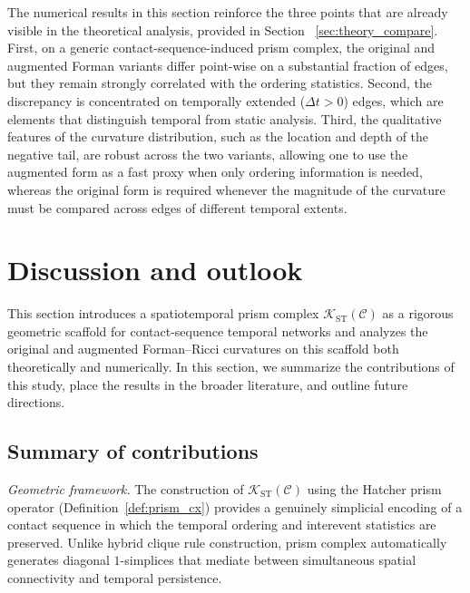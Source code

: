 \documentclass[
    pre,
    twocolumn,
    superscriptaddress,
    showpacs,
    nofootinbib,
    amsmath,
    amssymb,
    floatfix
]{revtex4-2}
\newcommand{\K}{\mathcal{K}}
\newcommand{\dt}{\Delta t}
\theoremstyle{plain} %
\theoremstyle{definition} %
\begin{document}
The numerical results in this section reinforce the three points that are already visible in the theoretical analysis, provided in Section ~\ref{sec:theory_compare}.
First, on a generic contact-sequence-induced prism complex, the original and augmented Forman variants differ point-wise on a substantial fraction of edges, but they remain strongly correlated with the ordering statistics.
Second, the discrepancy is concentrated on temporally extended ($\dt>0$) edges, which are elements that distinguish temporal from static analysis.
Third, the qualitative features of the curvature distribution, such as the location and depth of the negative tail, are robust across the two variants, allowing one to use the augmented form as a fast proxy when only ordering information is needed, whereas the original form is required whenever the magnitude of the curvature must be compared across edges of different temporal extents.

\section{Discussion and outlook}\label{sec:conclusion}

This section introduces a spatiotemporal prism complex
$\K_{\mathrm{ST}}(\mathcal{C})$ as a rigorous geometric scaffold for
contact-sequence temporal networks and analyzes the original
and augmented Forman--Ricci curvatures on this scaffold both theoretically and numerically.  In this section, we summarize the contributions of this study, place the results in the broader literature, and outline future directions.

\subsection{Summary of contributions}\label{ssec:summary}

\textit{Geometric framework.}  The construction of
$\K_{\mathrm{ST}}(\mathcal{C})$ using the Hatcher prism operator
\cite{Hatcher2002} (Definition~\ref{def:prism_cx}) provides a
genuinely simplicial encoding of a contact sequence in which the
temporal ordering and interevent statistics are preserved.  Unlike
hybrid clique rule construction, prism complex automatically
generates diagonal $1$-simplices that mediate between
simultaneous spatial connectivity and temporal persistence.
\end{document}
